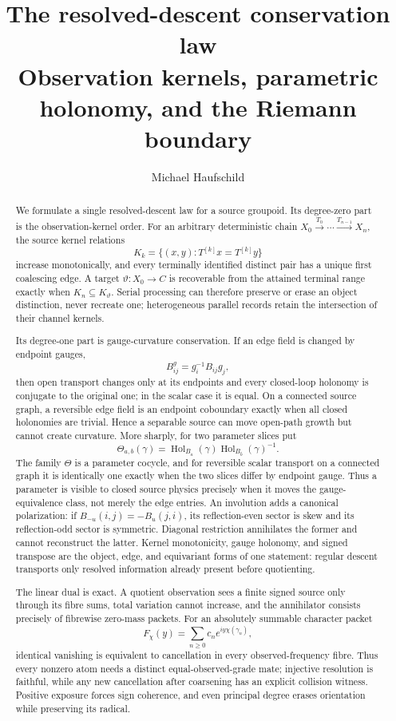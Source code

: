 \documentclass[11pt]{article}
\title{\textbf{The resolved-descent conservation law}\\
\large Observation kernels, parametric holonomy, and the Riemann boundary}
\author{Michael Haufschild}
\date{}
\theoremstyle{definition}
\theoremstyle{remark}
\begin{document}
\maketitle

\begin{abstract}
We formulate a single resolved-descent law for a source groupoid.  Its
degree-zero part is the observation-kernel order.  For an arbitrary
deterministic chain
\(X_0\xrightarrow{T_0}\cdots\xrightarrow{T_{n-1}}X_n\), the source kernel
relations
\[
 K_k=\{(x,y):T^{[k]}x=T^{[k]}y\}
\]
increase monotonically, and every terminally identified distinct pair has a
unique first coalescing edge.  A target \(\vartheta:X_0\to C\) is recoverable
from the attained terminal range exactly when
\(K_n\subseteq K_\vartheta\).  Serial processing can therefore preserve or
erase an object distinction, never recreate one; heterogeneous parallel
records retain the intersection of their channel kernels.

Its degree-one part is gauge-curvature conservation.  If an edge field is
changed by endpoint gauges,
\[
             B^g_{ij}=g_i^{-1}B_{ij}g_j,
\]
then open transport changes only at its endpoints and every closed-loop
holonomy is conjugate to the original one; in the scalar case it is equal.
On a connected source graph, a reversible edge field is an endpoint
coboundary exactly when all closed holonomies are trivial.  Hence a
separable source can move open-path growth but cannot create curvature.  More
sharply, for two parameter slices put
\[
 \Theta_{a,b}(\gamma)=
 \operatorname{Hol}_{B_a}(\gamma)
 \operatorname{Hol}_{B_b}(\gamma)^{-1}.
\]
The family \(\Theta\) is a parameter cocycle, and for reversible scalar
transport on a connected graph it is identically one exactly when the two
slices differ by endpoint gauge.  Thus a parameter is visible to closed
source physics precisely when it moves the gauge-equivalence class, not
merely the edge entries.  An
involution adds a canonical polarization: if
\(B_{-u}(i,j)=-B_u(j,i)\), its reflection-even sector is skew and its
reflection-odd sector is symmetric.  Diagonal restriction annihilates the
former and cannot reconstruct the latter.  Kernel monotonicity, gauge
holonomy, and signed transpose are the object, edge, and equivariant forms of
one statement: regular descent transports only resolved information already
present before quotienting.

The linear dual is exact.  A quotient observation sees a finite signed
source only through its fibre sums, total variation cannot increase, and the
annihilator consists precisely of fibrewise zero-mass packets.  For an
absolutely summable character packet
\[
 F_\chi(y)=\sum_{n\ge0}c_ne^{iy\chi(\gamma_n)},
\]
identical vanishing is equivalent to cancellation in every observed-frequency
fibre.  Thus every nonzero atom needs a distinct equal-observed-grade mate;
injective resolution is faithful, while any new cancellation after
coarsening has an explicit collision witness.  Positive exposure forces sign
coherence, and even principal degree erases orientation while preserving its
radical.


\end{abstract}
\end{document}
